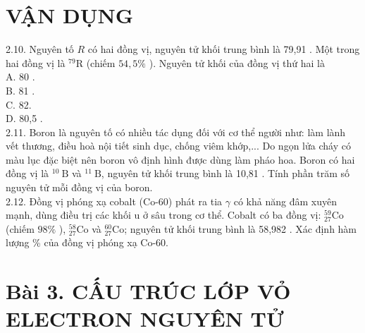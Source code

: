 \documentclass[10pt]{article}
\begin{document}
\section*{VẬN DỤNG}
2.10. Nguyên tố $R$ có hai đồng vị, nguyên tử khối trung bình là 79,91 . Một trong hai đồng vị là ${ }^{79} \mathrm{R}$ (chiếm $54,5 \%$ ). Nguyên tử khối của đồng vị thứ hai là\\
A. 80 .\\
B. 81 .\\
C. 82.\\
D. 80,5 .\\
2.11. Boron là nguyên tố có nhiều tác dụng đối với cơ thể người như: làm lành vết thương, điều hoà nội tiết sinh dục, chống viêm khớp,... Do ngọn lửa cháy có màu lục đặc biệt nên boron vô định hình được dùng làm pháo hoa. Boron có hai đồng vị là ${ }^{10} \mathrm{~B}$ và ${ }^{11} \mathrm{~B}$, nguyên tử khối trung bình là 10,81 . Tính phần trăm số nguyên tử mỗi đồng vị của boron.\\
2.12. Đồng vị phóng xạ cobalt (Co-60) phát ra tia $\gamma$ có khả năng đâm xuyên mạnh, dùng điều trị các khối u ở sâu trong cơ thể. Cobalt có ba đồng vị: ${ }_{27}^{59} \mathrm{Co}$ (chiếm $98 \%$ ), ${ }_{27}^{58} \mathrm{Co}$ và ${ }_{27}^{60} \mathrm{Co}$; nguyên tử khối trung bình là 58,982 . Xác định hàm lượng \% của đồng vị phóng xạ Co-60.

\section*{Bài 3. CẤU TRÚC LỚP VỎ ELECTRON NGUYÊN TỬ}
\end{document}

